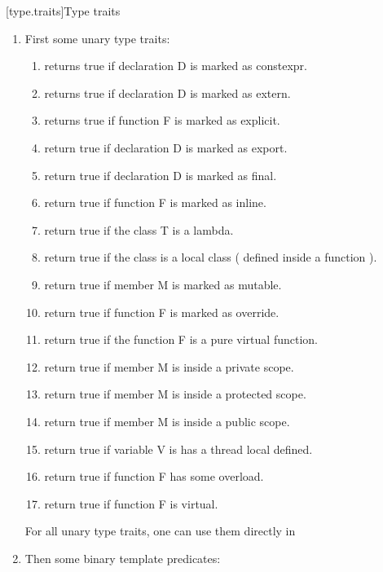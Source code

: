 [type.traits]{Type traits}
\begin{enumerate}
\item First some unary type traits:
\begin{enumerate}
\item {} returns true if declaration D is marked as constexpr.
\item {} returns true if declaration D is marked as extern.
\item {} returns true if function F is marked as explicit.
\item {} return true if declaration D is marked as export.
\item {} return true if declaration D is marked as final.
\item {} return true if function F is marked as inline.
\item {} return true if the class T is a lambda.
\item {} return true if the class is a local class ( defined inside a function ).
\item {} return true if member M is marked as mutable.
\item {} return true if function F is marked as override.
\item {} return true if the function F is a pure virtual function.
\item {} return true if member M is inside a private scope.
\item {} return true if member M is inside a protected scope.
\item {} return true if member M is inside a public scope.
\item {} return true if variable V is has a thread local defined. 
\item {} return true if function F has some overload.
\item {} return true if function F is virtual.
\end{enumerate}
For all unary type traits, one can use them directly in 
\item Then some binary template predicates:
\begin{enumerate}

\end{enumerate}
\end{enumerate}
